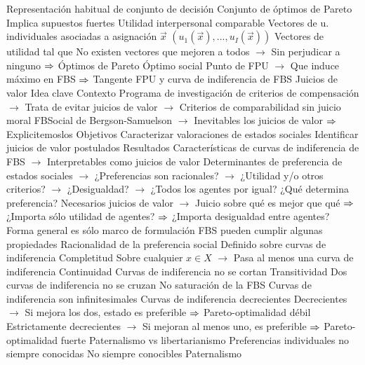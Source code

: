 \documentclass{nuevotema}
\begin{document}
\begin{esquemal}
				\4 Representación habitual de conjunto de decisión
				\4[] Conjunto de óptimos de Pareto
				\4 Implica supuestos fuertes
				\4[] Utilidad interpersonal comparable
				\4 Vectores de u. individuales asociadas a asignación $\vec{x}$
				\4[] $\left( u_1(\vec{x}), ..., u_I(\vec{x}) \right)$
				\4 Vectores de utilidad tal que
				\4[] No existen vectores que mejoren a todos
				\4[] $\to$ Sin perjudicar a ninguno
				\4[] $\Rightarrow$ Óptimos de Pareto
				\4[] 
			\3 Óptimo social
				\4 Punto de FPU
				\4[] $\to$ Que induce máximo en FBS
				\4[] $\Rightarrow$ Tangente FPU y curva de indiferencia de FBS
		\2 Juicios de valor
			\3 Idea clave
				\4 Contexto
				\4[] Programa de investigación de criterios de compensación
				\4[] $\to$ Trata de evitar juicios de valor
				\4[] $\to$ Criterios de comparabilidad sin juicio moral
				\4[] FBSocial de Bergson-Samuelson
				\4[] $\to$ Inevitables los juicios de valor
				\4[] $\Rightarrow$ Explicitemoslos
				\4 Objetivos
				\4[] Caracterizar valoraciones de estados sociales
				\4[] Identificar juicios de valor postulados
				\4 Resultados
				\4[] Características de curvas de indiferencia de FBS
				\4[] $\to$ Interpretables como juicios de valor
				\4[] Determinantes de preferencia de estados sociales
				\4[] $\to$ ¿Preferencias son racionales?
				\4[] $\to$ ¿Utilidad y/o otros criterios?
				\4[] $\to$ ¿Desigualdad?
				\4[] $\to$ ¿Todos los agentes por igual?
				\4 ¿Qué determina preferencia?
				\4[] Necesarios juicios de valor
				\4[] $\to$ Juicio sobre qué es mejor que qué
				\4[] $\Rightarrow$ ¿Importa sólo utilidad de agentes?
				\4[] $\Rightarrow$ ¿Importa desigualdad entre agentes?
				\4 Forma general es sólo marco de formulación
				\4 FBS pueden cumplir algunas propiedades
			\3 Racionalidad de la preferencia social
				\4 Definido sobre curvas de indiferencia
				\4 Completitud
				\4[] Sobre cualquier $x \in X$
				\4[] $\to$ Pasa al menos una curva de indiferencia
				\4 Continuidad
				\4[] Curvas de indiferencia no se cortan
				\4 Transitividad
				\4[] Dos curvas de indiferencia no se cruzan
				\4 No saturación de la FBS
				\4[] Curvas de indiferencia son infinitesimales
				\4 Curvas de indiferencia decrecientes
				\4[] Decrecientes
				\4[] $\to$ Si mejora los dos, estado es preferible
				\4[] $\Rightarrow$ Pareto-optimalidad débil
				\4[] Estrictamente decrecientes
				\4[] $\to$ Si mejoran al menos uno, es preferible
				\4[] $\Rightarrow$ Pareto-optimalidad fuerte
			\3 Paternalismo vs libertarianismo
				\4 Preferencias individuales no siempre conocidas
				\4 No siempre conocibles
				\4 Paternalismo

\end{esquemal}
\end{document}
